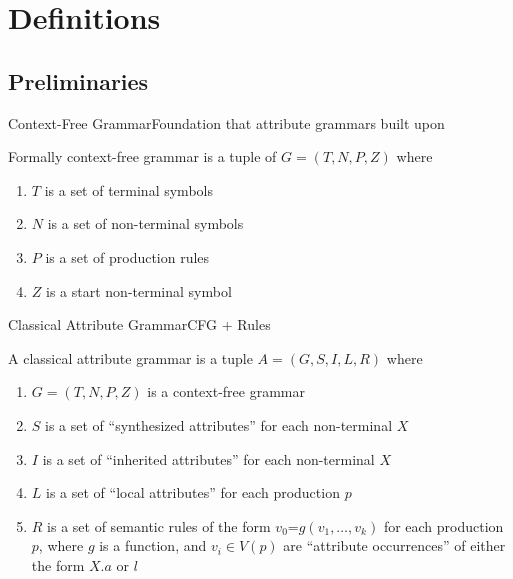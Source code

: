 
\section{Definitions}

\subsection*{Preliminaries}

\begin{frame}{Context-Free Grammar}{Foundation that attribute grammars built upon}

\begin{definition}
	Formally context-free grammar is a tuple of $G=(T, N, P, Z)$ where
	
	\begin{enumerate}
		\item $T$ is a set of terminal symbols
		\item $N$ is a set of non-terminal symbols
		\item $P$ is a set of production rules
		\item $Z$ is a start non-terminal symbol
	\end{enumerate}

\end{definition}
\end{frame}


\begin{frame}{Classical Attribute Grammar}{CFG + Rules}
\begin{definition}\label{def:ag-definition}
	A classical attribute grammar is a tuple $A = (G, S, I, L, R)$ where

	\begin{enumerate}
	    \item $G=(T, N, P, Z)$ is a context-free grammar
		\item $S$ is a set of \enquote{synthesized attributes} for each non-terminal $X$
		\item $I$ is a set of \enquote{inherited attributes} for each non-terminal $X$
		\item $L$ is a set of \enquote{local attributes} for each production $p$ 
		\item $R$ is a set of semantic rules of the form \alert{$v_0 \texttt{=} g(v_1, \dots, v_k)$} for each production $p$, where $g$ is a function, and $v_i \in V(p)$ are \enquote{attribute occurrences} of either the form $X.a$  or $l$
	\end{enumerate}

\end{definition}
\end{frame}

